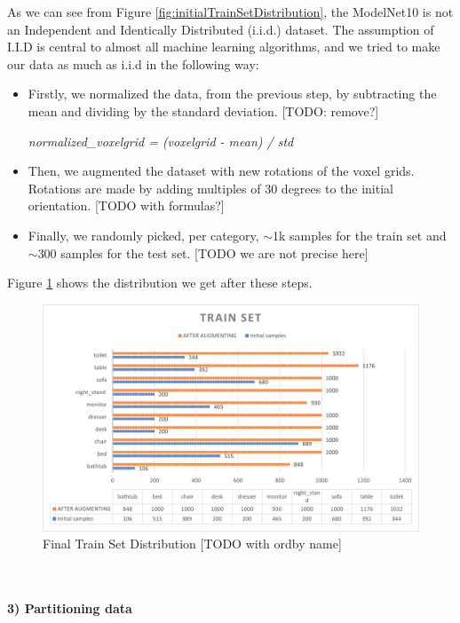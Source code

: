 As we can see from Figure \ref{fig:initialTrainSetDistribution}, the ModelNet10 is not an Independent and Identically Distributed (i.i.d.) dataset. The assumption of I.I.D is central to almost all machine learning algorithms, and we tried to make our data as much as i.i.d in the following way:
\begin{itemize}
	\item Firstly, we normalized the data, from the previous step, by subtracting the mean and dividing by the standard deviation. [TODO: remove?]
	\begin{center}
		\textit{
			normalized\_voxelgrid = (voxelgrid - mean) / std
		}
	\end{center}
	
	\item Then, we augmented the dataset with new rotations of the voxel grids. Rotations are made by adding multiples of 30 degrees to the initial orientation. [TODO with formulas?]
	
	\item Finally, we randomly picked, per category, $\sim$1k samples for the train set and $\sim$300 samples for the test set. [TODO we are not precise here]
	
\end{itemize}
Figure \ref{fig:finalTrainSetDistribution} shows the distribution we get after these steps.
\begin{figure}[]
	\centering
	\includegraphics[scale = 0.45]{resources/finalTrainDistribution.png}
	\caption{Final Train Set Distribution [TODO with ordby name]}
	\label{fig:finalTrainSetDistribution}
\end{figure}
\   \\\\ %
\textbf{3) Partitioning data}

